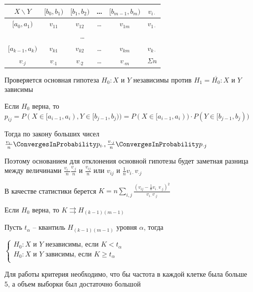 \begin{tabular}{c|c|c|c|c|c}
    $X\backslash Y$ & $[b_0, b_1)$ & $[b_1, b_2)$ & \dots & $[b_{m - 1}, b_m)$ & $v_{i\cdot}$ \\
    \hline
    $[a_0, a_1)$ & $v_{11}$ & $v_{12}$ & \dots & $v_{1m}$ & $v_{1\cdot}$ \\
    \hline
    \multicolumn{6}{c}{\dots} \\
    \hline
    $[a_{k - 1}, a_k)$ & $v_{k1}$ & $v_{k2}$ & \dots & $v_{km}$ & $v_{k\cdot}$ \\
    \hline
    $v_{\cdot j}$ & $v_{\cdot 1}$ & $v_{\cdot 2}$ & \dots & $v_{\cdot m}$ & $\Sigma n$ \\
\end{tabular}

Проверяется основная гипотеза $H_0 : X \text{ и } Y$ независимы против $H_1 = \overline{H_0} : X \text{ и } Y$ зависимы

Если $H_0$ верна, то $p_{ij} = P(X \in [a_{i - 1}, a_i), Y \in [b_{j - 1}, b_j)) = P(X \in [a_{i - 1}, a_i)) \cdot P(Y \in [b_{j - 1}, b_j))$

Тогда по закону больших чисел $\frac{v_{i\cdot}}{n} \ConvergesInProbability p_{i\cdot}, \frac{v_{\cdot j}}{n} \ConvergesInProbability p_{\cdot j}$

Поэтому основанием для отклонения основной гипотезы будет заметная разница между величинами $\frac{v_{i\cdot}}{n}\frac{v_{\cdot j}}{n}$ и 
$\frac{v_{ij}}{n}$ или $v_{ij}$ и $\frac{1}{n} v_{i\cdot} v_{\cdot j}$

В качестве статистики берется $K = n \sum_{i, j} \frac{\left(v_{ij} - \frac{1}{n} v_{i\cdot} v_{\cdot j}\right)^2}{v_{i\cdot} v_{\cdot j}}$

\begin{MyTheorem}
    \Ths Если $H_0$ верна, то $K \rightrightarrows H_{(k - 1)(m - 1)}$
\end{MyTheorem}

Пусть $t_\alpha$ -- квантиль $H_{(k - 1)(m - 1)}$ уровня $\alpha$, тогда 

$\begin{cases}
    H_0 : X \text{ и } Y \text{ независимы, если } K < t_\alpha \\
    H_0 : X \text{ и } Y \text{ зависимы, если } K \geq t_\alpha \\
\end{cases}$

\Nota Для работы критерия необходимо, что бы частота в каждой клетке была больше 5, а объем выборки был достаточно большой

